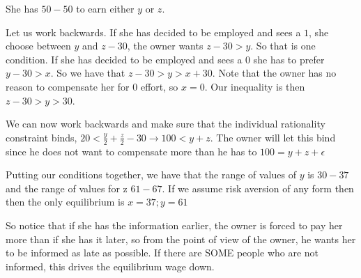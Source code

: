 \documentclass[12pt]{report}
\numberwithin{equation}{section}
\begin{document}
She has $50-50$ to earn either $y$ or $z$. 

Let us work backwards. If she has decided to be employed and sees a $1$, she choose between $y$ and $z-30$, the owner wants $z-30>y$. So that is one condition. 
If she has decided to be employed and sees a $0$ she has to prefer $y-30>x$. So we have that $z-30>y>x+30$. Note that the owner has no reason to compensate her for $0$ effort, so $x=0$. 
Our inequality is then $z-30>y>30$. 

We can now work backwards and make sure that the individual rationality constraint binds, $20< \frac{y}{2}+\frac{z}{2}-30 \rightarrow 100< y+z$. The owner will let this bind since he does not want to compensate more than he has to $100 = y+z+\epsilon$ 

Putting our conditions together, we have that the range of values of $y$ is $30-37$ and the range of values for z $61-67$. If we assume risk aversion of any form then then the only equilibrium is $x=37; y=61$

So notice that if she has the information earlier, the owner is forced to pay her more than if she has it later, so from the point of view of the owner, he wants her to be informed as late as possible. If there are SOME people who are not informed, this drives the equilibrium wage down. 
\end{document}
